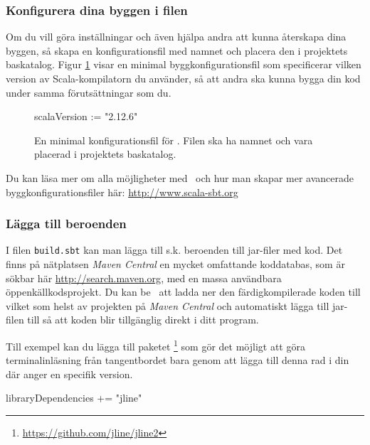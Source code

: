 \subsubsection{Konfigurera dina byggen i filen }

Om du vill göra inställningar och även hjälpa andra att kunna återskapa dina byggen, så skapa en konfigurationsfil med namnet  och placera den i projektets baskatalog. Figur \ref{fig:sbt:build-file} visar en minimal byggkonfigurationsfil som specificerar vilken version av Scala-kompilatorn du använder, så att andra ska kunna bygga din kod under samma förutsättningar som du.

\begin{figure}[H]
\centering
\begin{Code}
scalaVersion := "2.12.6"
\end{Code}
\caption{En minimal konfigurationsfil för \sbt. Filen ska ha namnet  och vara placerad i projektets baskatalog.}
\label{fig:sbt:build-file}
\end{figure}

\noindent Du kan läsa mer om alla möjligheter med \sbt\ och hur man skapar mer avancerade byggkonfigurationsfiler här: \url{http://www.scala-sbt.org}


\subsubsection{Lägga till beroenden}

I filen \texttt{build.sbt} kan man lägga till s.k. beroenden till jar-filer med kod. Det finns på nätplatsen \textit{Maven Central} en mycket omfattande koddatabas, som är sökbar här \url{http://search.maven.org}, med en massa användbara öppenkällkodsprojekt. Du kan be \sbt\ att ladda ner den färdigkompilerade koden till vilket som helst av projekten på \textit{Maven Central} och automatiskt lägga till jar-filen till  så att koden blir tillgänglig direkt i ditt program.

Till exempel kan du lägga till paketet \footnote{\url{https://github.com/jline/jline2}} som gör det möjligt att göra terminalinläsning från tangentbordet bara genom att lägga till denna rad i din  där  anger en specifik version.

\begin{Code}
libraryDependencies += "jline" %
\end{Code}

